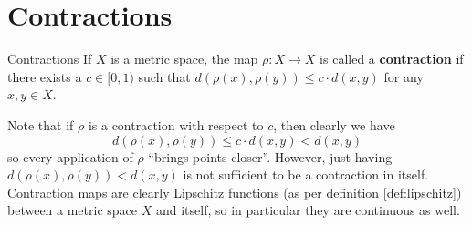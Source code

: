 \section{Contractions}

\begin{bdefin}{Contractions}{}
If $X$ is a metric space, the map $\rho : X \to X$ is called a \textbf{contraction} if there exists a $c \in [0,1)$ such that $d(\rho(x), \rho(y))\leq c \cdot d(x,y)$ for any $x,y \in X$.
\end{bdefin}

Note that if $\rho$ is a contraction with respect to $c$, then clearly we have \[ d(\rho(x), \rho(y))\leq c \cdot d(x,y)  < d(x,y)\] so every application of $\rho$ “brings points closer”. However, just having $d(\rho(x), \rho(y)) < d(x,y)$ is not sufficient to be a contraction in itself. Contraction maps are clearly Lipschitz functions (as per definition \ref{def:lipschitz}) between a metric space $X$ and itself, so in particular they are continuous as well.

